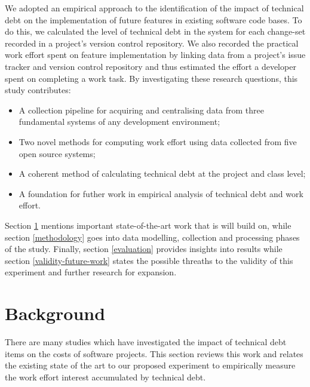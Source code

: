 \documentclass{mpaper}
\begin{document}
We adopted an empirical approach to the identification of the impact of
technical debt on the implementation of future features in existing software
code bases. To do this, we calculated the level of technical debt in the system
for each change-set recorded in a project's version control repository. We also
recorded the practical work effort spent on feature implementation by linking
data from a project's issue tracker and version control repository and thus
estimated the effort a developer spent on completing a work task. By
investigating these research questions, this study contributes:
\begin{itemize}
  \item A collection pipeline for acquiring and centralising data from three
  fundamental systems of any development environment;
  \item Two novel methods for computing work effort using data collected from
  five open source systems;
  \item A coherent method of calculating technical debt at the project and class
  level;
  \item A foundation for futher work in empirical analysis of technical debt and
  work effort.
\end{itemize}

Section \ref{background} mentions important state-of-the-art work that is will
build on, while section \ref{methodology} goes into data modelling, collection
and processing phases of the study. Finally, section \ref{evaluation}
provides insights into results while section \ref{validity-future-work} states
the possible threaths to the validity of this experiment and further research
for expansion.

\section{Background}
\label{background}

There are many studies which have investigated the impact of technical
debt items on the costs of software projects. This section reviews this work
and relates the existing state of the art to our proposed experiment to
empirically measure the work effort interest accumulated by technical debt.
\end{document}
